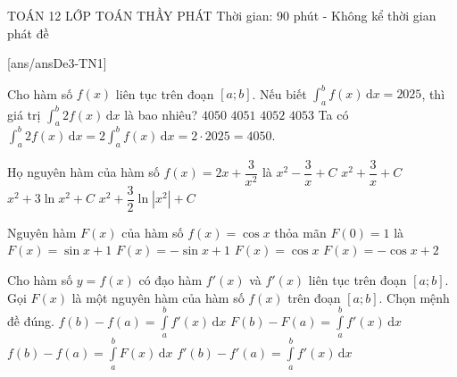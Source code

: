 ﻿\begin{name}
	{\tenchude}
	{TOÁN 12}
	{LỚP TOÁN THẦY PHÁT}
	{Thời gian: 90 phút - Không kể thời gian phát đề}
\end{name}
[ans/ansDe3-TN1]
\begin{ex}%
Cho hàm số $f(x)$ liên tục trên đoạn $[a;b]$. Nếu biết $\displaystyle\int_a^b f(x) \mathrm{\,d}x = 2025$, thì giá trị $\displaystyle\int_a^b 2f(x) \mathrm{\,d}x$ là bao nhiêu?
\choice
{\True $4050$}
{$4051$}
{$4052$}
{$4053$}
\loigiai
{ Ta có $\displaystyle\int_a^b 2f(x) \mathrm{\,d}x = 2\displaystyle\int_a^b f(x) \mathrm{\,d}x = 2 \cdot 2025 = 4050$.
}
\end{ex}

\begin{ex}%
Họ nguyên hàm của hàm số $f(x)=2x+\dfrac{3}{x^2}$ là
\choice
{\True $x^2-\dfrac{3}{x}+C$}
{$x^2+\dfrac{3}{x}+C$}
{$x^2+3\ln {x^2}+C$}
{$x^2+\dfrac{3}{2}\ln |x^2|+C$}
\end{ex}

\begin{ex}%
Nguyên hàm $F(x)$ của hàm số $f(x) = \cos x$ thỏa mãn $F(0) = 1$ là
\choice
{\True $F(x) = \sin x + 1$ }
{ $F(x) = -\sin x + 1$ }
{ $F(x) = \cos x$ }
{ $F(x) = -\cos x + 2$ }
\end{ex}

\begin{ex}%
Cho hàm số $y=f(x)$ có đạo hàm $f'(x)$ và $f'(x)$ liên tục trên đoạn $[a;b]$. Gọi $F(x)$ là một nguyên hàm của hàm số $f(x)$ trên đoạn $[a;b]$. Chọn mệnh đề đúng.
\choice
{\True $f(b)-f(a)=\displaystyle\int\limits_{a}^{b}f'(x)\mathrm{\,d}x$}
{$F(b)-F(a)=\displaystyle\int\limits_{a}^{b}f'(x)\mathrm{\,d}x$}
{$f(b)-f(a)=\displaystyle\int\limits_{a}^{b}F(x)\mathrm{\,d}x$}
{$f'(b)-f'(a)=\displaystyle\int\limits_{a}^{b}f'(x)\mathrm{\,d}x$}
\end{ex}

